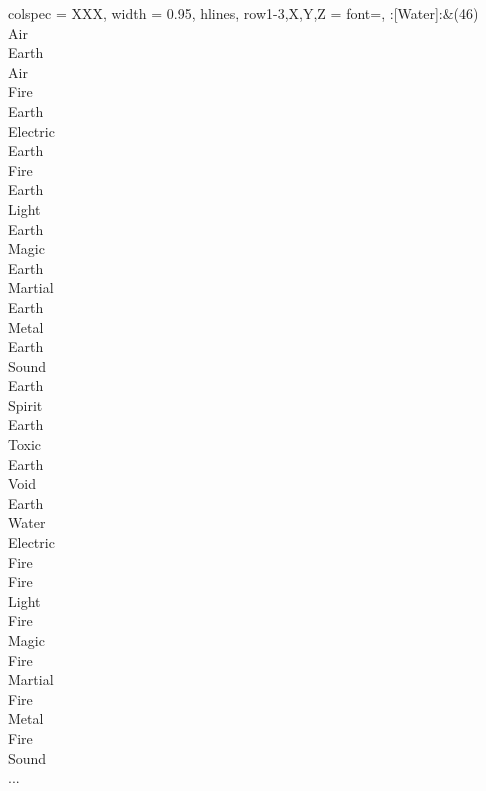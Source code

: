 \begin{longtblr}[
	caption = {2v1 Defending Weak},
	label = {2v1-Defending-Weak},
]{
	colspec = {XXX}, width = 0.95\linewidth,
	hlines,
	row{1-3,X,Y,Z} = {font=\bfseries},
}
	:[Water]:&{(46)\\
	Air \\
	Earth \\
	Air \\
	Fire \\
	Earth \\
	Electric \\
	Earth \\
	Fire \\
	Earth \\
	Light \\
	Earth \\
	Magic \\
	Earth \\
	Martial \\
	Earth \\
	Metal \\
	Earth \\
	Sound \\
	Earth \\
	Spirit \\
	Earth \\
	Toxic \\
	Earth \\
	Void \\
	Earth \\
	Water \\
	Electric \\
	Fire \\
	Fire \\
	Light \\
	Fire \\
	Magic \\
	Fire \\
	Martial \\
	Fire \\
	Metal \\
	Fire \\
	Sound \\
	...\\
	}\\


\end{longtblr}
